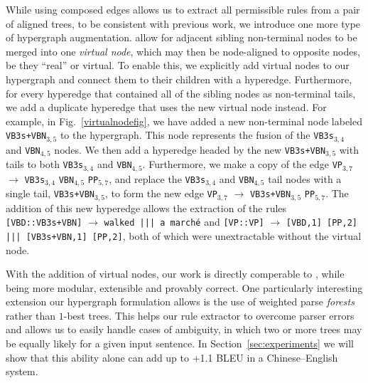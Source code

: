\documentclass[nofonts]{pbml} %
\begin{document}
While using composed edges allows us to extract all permissible rules from a pair of aligned trees, to be consistent with previous work,
we introduce one more type of hypergraph augmentation.
\citet{hanneman2011general} allow for adjacent sibling non-terminal nodes to be merged into one \emph{virtual node}, which may then be node-aligned to opposite nodes,
be they ``real'' or virtual. To enable this, we explicitly add virtual nodes to our hypergraph and connect them to their children with a hyperedge.
Furthermore, for every hyperedge that contained all of the sibling nodes
as non-terminal tails, we add a duplicate hyperedge that uses the new virtual node instead. For example, in Fig.~\ref{virtualnodefig},
we have added a new non-terminal node labeled \texttt{VB3s+VBN}$_{3,5}$ to the hypergraph. This node represents the fusion of the \texttt{VB3s}$_{3,4}$ and \texttt{VBN}$_{4,5}$ nodes.
We then add a hyperedge headed by the new \texttt{VB3s+VBN}$_{3,5}$ with tails to both \texttt{VB3s}$_{3,4}$ and \texttt{VBN}$_{4,5}$.
Furthermore, we make a copy of the edge \texttt{VP}$_{3,7}$ $\rightarrow$ \texttt{VB3s}$_{3,4}$ \texttt{VBN}$_{4,5}$ \texttt{PP}$_{5,7}$, and replace the
\texttt{VB3s}$_{3,4}$ and \texttt{VBN}$_{4,5}$ tail nodes with a single tail, \texttt{VB3s+VBN}$_{3,5}$, to form the new edge
\texttt{VP}$_{3,7}$ $\rightarrow$ \texttt{VB3s+VBN}$_{3,5}$ \texttt{PP}$_{5,7}$. The addition of this new hyperedge allows the extraction of the rules
\texttt{[VBD::VB3s+VBN]} $\rightarrow$ \texttt{walked ||| a march\'{e}} and
\texttt{[VP::VP]} $\rightarrow$ \texttt{[VBD,1] [PP,2]  ||| [VB3s+VBN,1] [PP,2]}, both of which were unextractable without the virtual node.

With the addition of virtual nodes, our work is directly comperable to \citet{hanneman2011general}, while being more modular, extensible and provably correct.
One particularly interesting extension our hypergraph formulation allows is the use of weighted parse \emph{forests} rather than $1$-best trees.
This helps our rule extractor to overcome parser errors and allows us to easily handle cases of ambiguity, in which two or more trees may be equally likely
for a given input sentence. In Section~\ref{sec:experiments} we will show that this ability alone can add up to +1.1 \textsc{BLEU} in a Chinese--English system.
\end{document}
